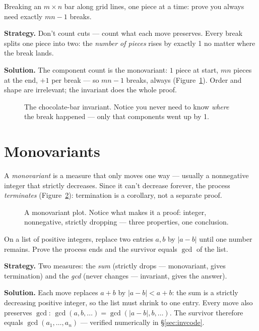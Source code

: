 \begin{example}
Breaking an $m\times n$ bar along grid lines, one piece at a time:
prove you always need exactly $mn-1$ breaks.

\textbf{Strategy.} Don't count cuts --- count what each move preserves.
Every break splits one piece into two: the \emph{number of pieces} rises
by exactly 1 no matter where the break lands.

\textbf{Solution.} The component count is the monovariant:
$1$ piece at start, $mn$ pieces at the end, $+1$ per break ---
so $mn-1$ breaks, always (Figure~\ref{fig:choco}). Order and shape are
irrelevant; the invariant does the whole proof.
\end{example}
\begin{figure}[ht]\centering

\caption{The chocolate-bar invariant. Notice you never need to know
\emph{where} the break happened --- only that components went up by 1.}
\label{fig:choco}
\end{figure}

\section{Monovariants}
A \emph{monovariant} is a measure that only moves one way --- usually a
nonnegative integer that strictly decreases. Since it can't decrease
forever, the process \emph{terminates} (Figure~\ref{fig:descent}):
termination is a corollary, not a separate proof.
\begin{figure}[ht]\centering

\caption{A monovariant plot. Notice what makes it a proof: integer,
nonnegative, strictly dropping --- three properties, one conclusion.}
\label{fig:descent}
\end{figure}

\begin{example}
On a list of positive integers, replace two entries $a,b$ by $|a-b|$
until one number remains. Prove the process ends and the survivor
equals $\gcd$ of the list.

\textbf{Strategy.} Two measures: the \emph{sum} (strictly drops ---
monovariant, gives termination) and the \emph{gcd} (never changes ---
invariant, gives the answer).

\textbf{Solution.} Each move replaces $a+b$ by $|a-b|<a+b$: the sum is a
strictly decreasing positive integer, so the list must shrink to one
entry. Every move also preserves $\gcd$: $\gcd(a,b,\dots) =
\gcd(|a-b|,b,\dots)$. The survivor therefore equals
$\gcd(a_1,\dots,a_n)$ --- verified numerically in \S\ref{sec:invcode}.
\end{example}

